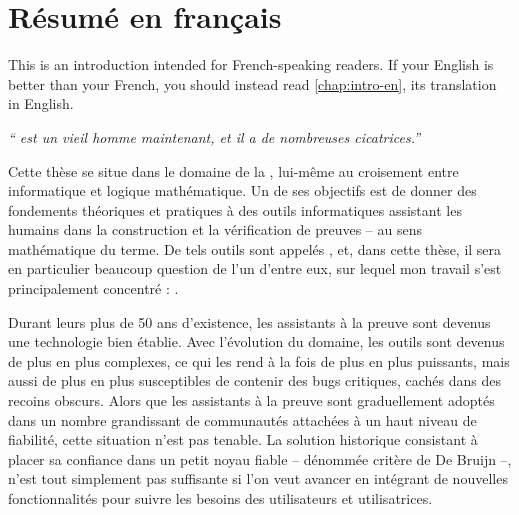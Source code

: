 \chapter{Résumé en français}
\label{chap:intro-fr}

\begin{kaobox}[backgroundcolor=Black!10!White,frametitlebackgroundcolor=Black!10!White]
  This  is an introduction intended for French-speaking readers.
  If your English is better than your French,
  you should instead read \cref{chap:intro-en}, its translation in English.
\end{kaobox}

\emph{“ est un vieil homme maintenant, et il a de nombreuses cicatrices.”}
\vspace{-1.5em}
\begin{flushright}
\end{flushright}

\margintoc[6em]

Cette thèse se situe dans le domaine de la ,%
lui-même au croisement entre informatique et logique mathématique.
Un de ses objectifs est de donner des fondements théoriques et pratiques
à des outils informatiques assistant les humains dans la construction
et la vérification de preuves – au sens mathématique du terme.
De tels outils sont appelés , et, dans cette thèse, il sera
en particulier beaucoup question de l’un d’entre eux,
sur lequel mon travail s’est principalement concentré : .

Durant leurs plus de 50 ans d’existence, les assistants à la preuve sont devenus une
technologie bien établie. Avec l’évolution du domaine, les outils sont devenus de plus en
plus complexes, ce qui les rend à la fois de plus en plus puissants, mais aussi de plus
en plus susceptibles de contenir des bugs critiques, cachés dans des recoins obscurs.
Alors que les
assistants à la preuve sont graduellement adoptés dans un nombre grandissant de communautés
attachées à un haut niveau de fiabilité, cette situation n’est pas tenable.
La solution historique consistant à placer sa confiance dans un petit noyau fiable
– dénommée critère de De Bruijn –, n’est tout simplement pas suffisante si l’on veut avancer
en intégrant de nouvelles fonctionnalités pour suivre les besoins des utilisateurs
et utilisatrices.

